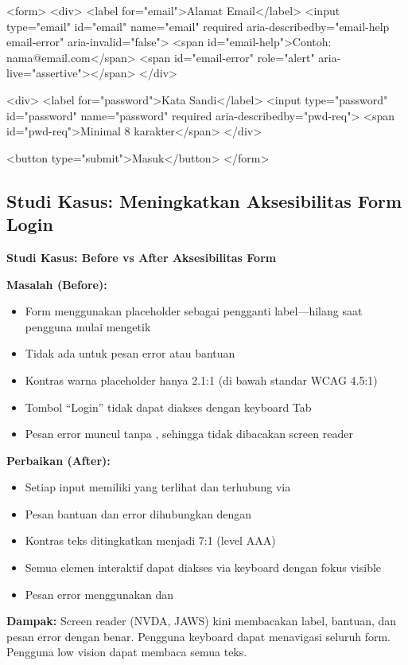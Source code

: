 \begin{webcode}[language=HTML, caption={Contoh penggunaan ARIA pada form login aksesibel}]
<form>
  <div>
    <label for="email">Alamat Email</label>
    <input type="email" id="email" name="email" 
           required
           aria-describedby="email-help email-error"
           aria-invalid="false">
    <span id="email-help">Contoh: nama@email.com</span>
    <span id="email-error" role="alert" 
          aria-live="assertive"></span>
  </div>
  
  <div>
    <label for="password">Kata Sandi</label>
    <input type="password" id="password" name="password"
           required
           aria-describedby="pwd-req">
    <span id="pwd-req">Minimal 8 karakter</span>
  </div>
  
  <button type="submit">Masuk</button>
</form>
\end{webcode}

\subsection{Studi Kasus: Meningkatkan Aksesibilitas Form Login}

\begin{contoh}
\textbf{Studi Kasus: Before vs After Aksesibilitas Form}

\textbf{Masalah (Before):}
\begin{itemize}
  \item Form menggunakan placeholder sebagai pengganti label---hilang saat pengguna mulai mengetik
  \item Tidak ada  untuk pesan error atau bantuan
  \item Kontras warna placeholder hanya 2.1:1 (di bawah standar WCAG 4.5:1)
  \item Tombol ``Login'' tidak dapat diakses dengan keyboard Tab
  \item Pesan error muncul tanpa , sehingga tidak dibacakan screen reader
\end{itemize}

\textbf{Perbaikan (After):}
\begin{itemize}
  \item Setiap input memiliki  yang terlihat dan terhubung via 
  \item Pesan bantuan dan error dihubungkan dengan 
  \item Kontras teks ditingkatkan menjadi 7:1 (level AAA)
  \item Semua elemen interaktif dapat diakses via keyboard dengan fokus visible
  \item Pesan error menggunakan  dan 
\end{itemize}

\textbf{Dampak:} Screen reader (NVDA, JAWS) kini membacakan label, bantuan, dan pesan error dengan benar. Pengguna keyboard dapat menavigasi seluruh form. Pengguna low vision dapat membaca semua teks.
\end{contoh}

